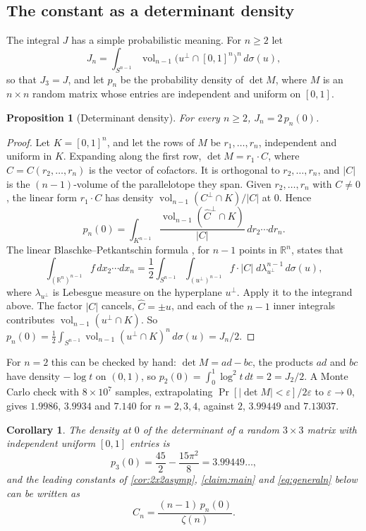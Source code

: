 \documentclass[11pt]{article}
\newtheorem{proposition}[theorem]{Proposition}
\newtheorem{corollary}[theorem]{Corollary}
\theoremstyle{definition}
\newcommand{\R}{\mathbb{R}}
\newcommand{\abs}[1]{\left\lvert #1 \right\rvert}
\begin{document}
\subsection{The constant as a determinant density}\label{sec:detdensity}

The integral $J$ has a simple probabilistic meaning. For $n\ge2$ let
\[
J_n=\int_{S^{n-1}}\operatorname{vol}_{n-1}\bigl(u^\perp\cap[0,1]^n\bigr)^n\,d\sigma(u),
\]
so that $J_3=J$, and let $p_n$ be the probability density of $\det M$, where $M$ is an $n\times n$ random matrix whose entries are independent and uniform on $[0,1]$.

\begin{proposition}[Determinant density]\label{prop:detdensity}
For every $n\ge2$, $J_n=2\,p_n(0)$.
\end{proposition}

\begin{proof}
Let $K=[0,1]^n$, and let the rows of $M$ be $r_1,\dots,r_n$, independent and uniform in $K$. Expanding along the first row, $\det M=r_1\cdot C$, where $C=C(r_2,\dots,r_n)$ is the vector of cofactors. It is orthogonal to $r_2,\dots,r_n$, and $\abs C$ is the $(n-1)$-volume of the parallelotope they span. Given $r_2,\dots,r_n$ with $C\ne0$, the linear form $r_1\cdot C$ has density $\operatorname{vol}_{n-1}(C^\perp\cap K)/\abs C$ at $0$. Hence
\[
p_n(0)=\int_{K^{n-1}}\frac{\operatorname{vol}_{n-1}(\hat C^\perp\cap K)}{\abs C}\,dr_2\cdots dr_n .
\]
The linear Blaschke--Petkantschin formula \cite[Thm.~7.2.1]{SchneiderWeil}, for $n-1$ points in $\R^n$, states that
\[
\int_{(\R^n)^{n-1}}f\,dx_2\cdots dx_n=\frac12\int_{S^{n-1}}\int_{(u^\perp)^{n-1}}f\cdot\abs C\;d\lambda^{n-1}_{u^\perp}\,d\sigma(u),
\]
where $\lambda_{u^\perp}$ is Lebesgue measure on the hyperplane $u^\perp$. Apply it to the integrand above. The factor $\abs C$ cancels, $\hat C=\pm u$, and each of the $n-1$ inner integrals contributes $\operatorname{vol}_{n-1}(u^\perp\cap K)$. So $p_n(0)=\frac12\int_{S^{n-1}}\operatorname{vol}_{n-1}(u^\perp\cap K)^n\,d\sigma(u)=J_n/2$.
\end{proof}

For $n=2$ this can be checked by hand: $\det M=ad-bc$, the products $ad$ and $bc$ have density $-\log t$ on $(0,1)$, so $p_2(0)=\int_0^1\log^2t\,dt=2=J_2/2$. A Monte Carlo check with $8\times10^7$ samples, extrapolating $\Pr[\abs{\det M}<\varepsilon]/2\varepsilon$ to $\varepsilon\to0$, gives $1.9986$, $3.9934$ and $7.140$ for $n=2,3,4$, against $2$, $3.99449$ and $7.13037$.

\begin{corollary}\label{cor:detdensity}
The density at $0$ of the determinant of a random $3\times3$ matrix with independent uniform $[0,1]$ entries is
\[
p_3(0)=\frac{45}{2}-\frac{15\pi^2}{8}=3.99449\ldots,
\]
and the leading constants of \cref{cor:2x2asymp}, \cref{claim:main} and \eqref{eq:generaln} below can be written as
\[
C_n=\frac{(n-1)\,p_n(0)}{\zeta(n)}.
\]
\end{corollary}
\end{document}
